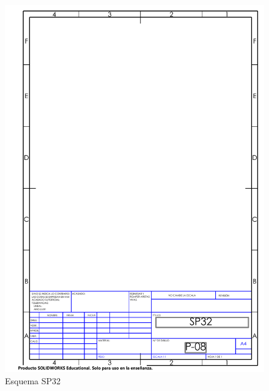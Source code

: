     \begin{figure}[H]
        \centering
        \includegraphics[trim = {10mm 10mm 10mm 10mm},clip,scale=0.2]{23/img/SP32.pdf}
        \caption{Esquema SP32}
        \label{fig:lcd-16x2}
    \end{figure}

